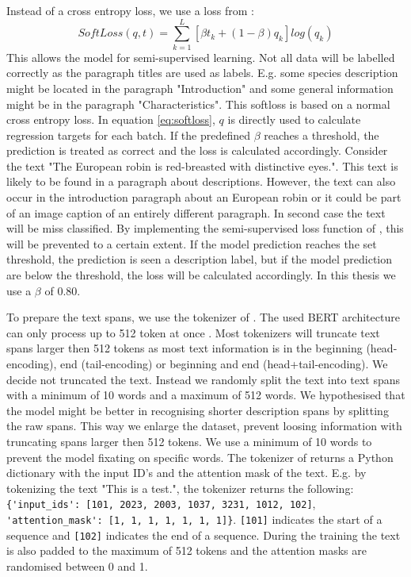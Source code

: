 \documentclass[a4paper, 12pt, oneside]{book} %
\begin{document}
Instead of a cross entropy loss, we use a loss from \textcite{reed_training_2015}:
\begin{equation} \label{eq:softloss}
 SoftLoss(q, t) = \sum_{k=1}^{L}[\beta t _k + (1- \beta )q _k]log(q _k)
\end{equation}
This allows the model for semi-supervised learning.
Not all data will be labelled correctly as the paragraph titles are used as labels.
E.g. some species description might be located in the paragraph "Introduction" and some general information might be in the paragraph "Characteristics".
This softloss is based on a normal cross entropy loss.
In equation \ref{eq:softloss}, \(q\) is directly used to calculate regression targets for each batch.
If the predefined \(\beta\) reaches a threshold, the prediction is treated as correct and the loss is calculated accordingly.
Consider the text "The European robin is red-breasted with distinctive eyes.".
This text is likely to be found in a paragraph about descriptions.
However, the text can also occur in the introduction paragraph about an European robin or it could be part of an image caption of an entirely different paragraph. 
In second case the text will be miss classified. 
By implementing the semi-supervised loss function of \textcite{reed_training_2015}, this will be prevented to a certain extent.
If the model prediction reaches the set threshold, the prediction is seen a description label, but if the model prediction are below the threshold, the loss will be calculated accordingly.
In this thesis we use a \(\beta\) of 0.80. 

To prepare the text spans, we use the tokenizer of \textcite{wolf_huggingfaces_2020}.
The used BERT architecture can only process up to 512 token at once \autocite{sanh_distilbert_2020, devlin_bert_2019}.
Most tokenizers will truncate text spans larger then 512 tokens as most text information is in the beginning (head-encoding), end (tail-encoding) or beginning and end (head+tail-encoding).
We decide not truncated the text.
Instead we randomly split the text into text spans with a minimum of 10 words and a maximum of 512 words.
We hypothesised that the model might be better in recognising shorter description spans by splitting the raw spans.  
This way we enlarge the dataset, prevent loosing information with truncating spans larger then 512 tokens. 
We use a minimum of 10 words to prevent the model fixating on specific words.
The tokenizer of \textcite{wolf_huggingfaces_2020} returns a Python dictionary with the input ID's and the attention mask of the text.
E.g. by tokenizing the text "This is a test.", the tokenizer returns the following:
\verb|{'input_ids': [101, 2023, 2003, 1037, 3231, 1012, 102]|, 
\verb|'attention_mask': [1, 1, 1, 1, 1, 1, 1]}|.
\verb|[101]| indicates the start of a sequence and \verb|[102]| indicates the end of a sequence.
During the training the text is also padded to the maximum of 512 tokens and the attention masks are randomised between 0 and 1.
\end{document}
